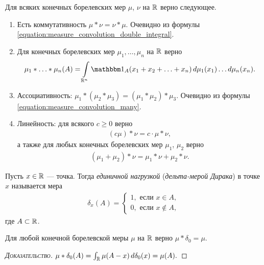 \documentclass[../main.tex]{subfiles}
\begin{document}
\begin{prop} Для всяких конечных борелевских мер $ \mu $, $ \nu $ на $ \mathbb{R} $ верно следующее.
 \begin{enumerate}
  \item Есть коммутативность $ \mu \ast \nu = \nu \ast \mu $. Очевидно из формулы \eqref{equation:measure_convolution_double_integral}.
 \item Для конечных борелевских мер $ \mu_1, \ldots, \mu_n $ на $ \mathbb{R} $ верно
\begin{align}
 \label{equation:measure_convolution_many}
 \mu_1 \ast \ldots \ast \mu_n (A) = \int\limits_{\R^{n}}\Ind_A(x_1 + x_2 + \ldots + x_n)\,d\mu_1(x_1) \ldots d\mu_n(x_n).   
\end{align}
\item Ассоциативность: $ \mu_1 \ast (\mu_2 \ast \mu_3) = (\mu_1 \ast \mu_2) \ast \mu_3 $. Очевидно из формулы \eqref{equation:measure_convolution_many}.
\item Линейность: для всякого $ c \geqslant 0 $ верно
 \begin{align*}
  (c\mu) \ast \nu = c \cdot \mu \ast \nu,
 \end{align*} а также для любых конечных борелевских мер $ \mu_1 $, $ \mu_2 $ верно
 \begin{align*}
  (\mu_1 + \mu_2) \ast \nu = \mu_1 \ast\nu + \mu_2\ast\nu.
 \end{align*} 
\end{enumerate}
\end{prop}

\begin{df}
 Пусть $ x \in \mathbb{R} $ --- точка. Тогда \textit{единичной нагрузкой} (\textit{дельта-мерой Дирака}) в точке $ x $ называется мера
 \begin{align*}
  \delta_x(A) = \begin{cases}
   1, \text{ если } x \in A, \\
   0, \text{ если } x\notin A,
  \end{cases} 
 \end{align*} где $ A \subset \mathbb{R} $.
\end{df}

\begin{prop}
 Для любой конечной борелевской меры $ \mu $ на $ \mathbb{R} $ верно $ \mu \ast \delta_0 = \mu $.
\end{prop}
\begin{proof}[\normalfont\textsc{Доказательство}]
 $ \mu \ast \delta_0(A) = \int_{\mathbb{R}} \mu(A-x)\,d\delta_0(x) = \mu(A).  $
\end{proof}
\end{document}
